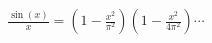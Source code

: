\documentclass[preview]{standalone}
\begin{document}
\begin{align*}
\frac{\sin(x)}{x} = \left(1 - \frac{x^2}{\pi^2}\right)\left(1 - \frac{x^2}{4\pi^2}\right)\cdots
\end{align*}
\end{document}

